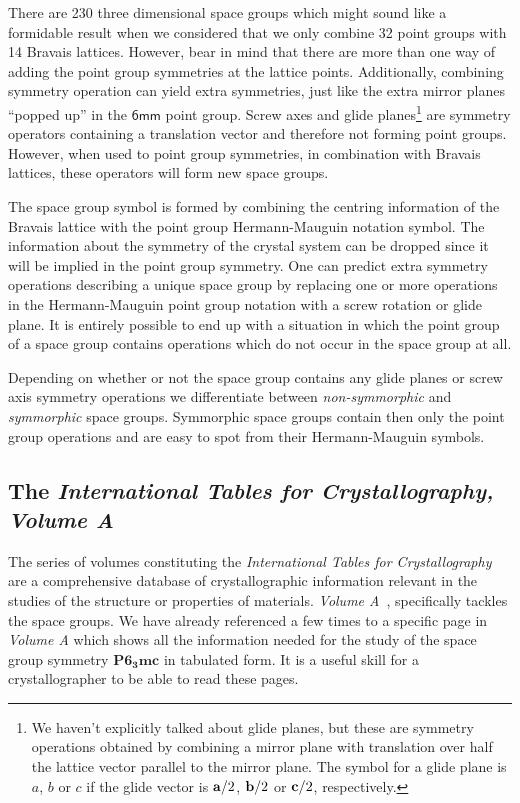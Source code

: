 There are 230 three dimensional space groups which might sound like a formidable result when we considered that we only combine 32 point groups with 14 Bravais lattices. However, bear in mind that there are more than one way of adding the point group symmetries at the lattice points. Additionally, combining symmetry operation can yield extra symmetries, just like the extra mirror planes ``popped up'' in the $\mathsf{6mm}$ point group. Screw axes and glide planes\footnote{ We haven't explicitly talked about glide planes, but these are symmetry operations obtained by combining a mirror plane with translation over half the lattice vector parallel to the mirror plane. The symbol for a glide plane is $a$, $b$ or $c$ if the glide vector is $\vb{a}/2$, $\vb{b}/2$ or $\vb{c}/2$, respectively.} are symmetry operators containing a translation vector and therefore not forming point groups. However, when used to point group symmetries, in combination with Bravais lattices, these operators will form new space groups. 

The space group symbol is formed by combining the centring information of the Bravais lattice with the point group Hermann-Mauguin notation symbol. The information about the symmetry of the crystal system can be dropped since it will be implied in the point group symmetry. One can predict extra symmetry operations describing a unique space group by replacing one or more operations in the Hermann-Mauguin point group notation with a screw rotation or glide plane. It is entirely possible to end up with a situation in which the point group of a space group contains operations which do not occur in the space group at all.  
 
Depending on whether or not the space group contains any glide planes or screw axis symmetry operations we differentiate between \textit{non-symmorphic} and \textit{symmorphic} space groups. Symmorphic space groups contain then only the point group operations and are easy to spot from their Hermann-Mauguin symbols.






 



\subsection{The \textit{International Tables for Crystallography, Volume A}}
\label{chap:int}

The series of volumes constituting the \textit{International Tables for Crystallography} are a comprehensive database of crystallographic information relevant in the studies of the structure or properties of materials. \textit{Volume A}~\cite{IntTableCrysA}, specifically tackles the space groups. We have already referenced a few times to a specific page in \textit{Volume A} which shows all the information needed for the study of the space group symmetry $\mathbf{P6_3mc}$ in tabulated form. It is a useful skill for a crystallographer to be able to read these pages.

